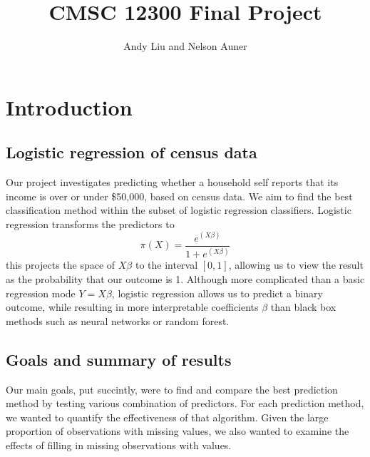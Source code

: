 \documentclass[11pt]{article}
\title{CMSC 12300 Final Project}
\author{Andy Liu and Nelson Auner}
\begin{document}
\maketitle
\section{Introduction}

\subsection{Logistic regression of census data}
Our project investigates predicting whether a household self reports that its income is over or under \$50,000, based on census data. 
We aim to find the best classification method within the subset of logistic regression classifiers. Logistic regression transforms the predictors to
\begin{equation}
\pi(X) = \frac{e^{(X\beta)}}{1+e^{(X\beta)}}
\end{equation}
this projects the space of $X \beta$ to the interval $[0,1]$, allowing us to view the result as the probability that our outcome is 1. Although more complicated than a basic regression mode $Y = X\beta$, logistic regression allows us to predict a binary outcome, while resulting in more interpretable coefficients $\beta$ than black box methods such as neural networks or random forest. 
\subsection{Goals and summary of results}
Our main goals, put succintly, were to find and compare the best prediction method by testing various combination of predictors. For each prediction method, we wanted to quantify the effectiveness of that algorithm. Given the large proportion of observations with missing values, we also wanted to examine the effects of filling in missing observations with values. 
\end{document}
